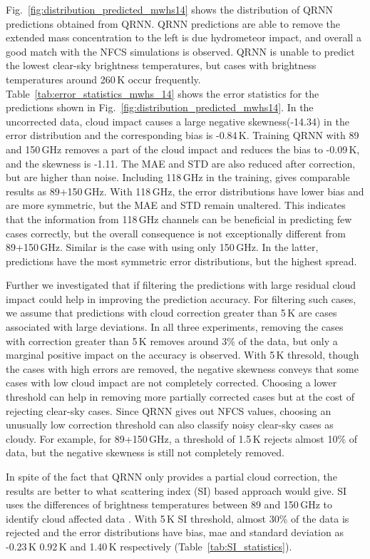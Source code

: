 \documentclass[amt]{copernicus}
\begin{document}
Fig.~\ref{fig:distribution_predicted_mwhs14} shows the distribution of QRNN predictions obtained from QRNN. QRNN predictions are able to remove the extended mass concentration to the left is due hydrometeor impact, and overall a good match with the NFCS simulations is observed. QRNN is unable to predict the lowest clear-sky brightness temperatures, but cases with brightness temperatures around 260\,K occur frequently.  Table~\ref{tab:error_statistics_mwhs_14} shows the error statistics for the predictions shown in Fig.~\ref{fig:distribution_predicted_mwhs14}. In the uncorrected data, cloud impact causes a large negative skewness(-14.34) in the error distribution and the corresponding bias is -0.84\,K. Training QRNN with 89 and 150\,GHz removes a part of the cloud impact and reduces the bias to -0.09\,K, and the skewness is -1.11. The MAE and STD are also reduced after correction, but are higher than noise. Including 118\,GHz in the training, gives comparable results as 89+150\,GHz. With 118\,GHz, the error distributions have lower bias and are more symmetric, but the MAE and STD remain unaltered. This indicates that the information from 118\,GHz channels can be beneficial in predicting few cases correctly, but the overall consequence is not exceptionally different from 89+150\,GHz. Similar is the case with using only 150\,GHz. In the latter, predictions have the most symmetric  error distributions, but the highest spread. 

Further we investigated that if filtering the predictions with large residual cloud impact could help in improving the prediction accuracy. For filtering such cases, we assume that predictions with cloud correction greater than 5\,K are cases associated with large deviations. In all three experiments, removing the cases with correction greater than 5\,K removes around 3\% of the data, but only a marginal positive impact on the accuracy is observed. With 5\,K thresold, though the cases with high errors are removed, the negative skewness conveys that some cases with low cloud impact are not completely corrected. Choosing a lower threshold can help in removing more partially corrected cases but at the cost of rejecting clear-sky cases. Since QRNN gives out NFCS values, choosing an unusually low correction threshold can also classify noisy clear-sky cases as cloudy. For example, for 89+150\,GHz, a threshold of 1.5\,K rejects almost 10\% of data, but the negative skewness is still not completely removed. 

In spite of the fact that QRNN only provides a partial cloud correction, the results are better to what scattering index (SI) based approach would give. SI uses the differences of brightness temperatures between 89 and 150\,GHz to identify cloud affected data \citep{geer2015scatteringindex}. With 5\,K SI threshold, almost 30\% of the data is rejected and the error distributions have bias, mae and standard deviation as -0.23\,K 0.92\,K and 1.40\,K respectively (Table~\ref{tab:SI_statistics}). 
\end{document}
